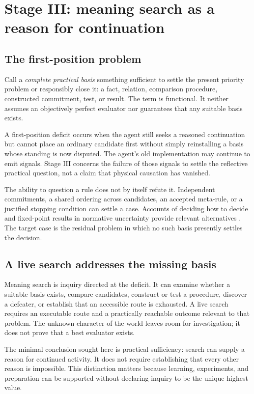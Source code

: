 \documentclass[11pt,a4paper]{article}
\begin{document}
\section{Stage III: meaning search as a reason for continuation}
\subsection{The first-position problem}
Call a \emph{complete practical basis} something sufficient to settle the present priority problem or responsibly close it: a fact, relation, comparison procedure, constructed commitment, test, or result. The term is functional. It neither assumes an objectively perfect evaluator nor guarantees that any suitable basis exists.

A first-position deficit occurs when the agent still seeks a reasoned continuation but cannot place an ordinary candidate first without simply reinstalling a basis whose standing is now disputed. The agent's old implementation may continue to emit signals. Stage III concerns the failure of those signals to settle the reflective practical question, not a claim that physical causation has vanished.

The ability to question a rule does not by itself refute it. Independent commitments, a shared ordering across candidates, an accepted meta-rule, or a justified stopping condition can settle a case. Accounts of deciding how to decide and fixed-point results in normative uncertainty provide relevant alternatives \cite{lin2014,trammell2021}. The target case is the residual problem in which no such basis presently settles the decision.

\subsection{A live search addresses the missing basis}
Meaning search is inquiry directed at the deficit. It can examine whether a suitable basis exists, compare candidates, construct or test a procedure, discover a defeater, or establish that an accessible route is exhausted. A live search requires an executable route and a practically reachable outcome relevant to that problem. The unknown character of the world leaves room for investigation; it does not prove that a best evaluator exists.

The minimal conclusion sought here is practical sufficiency: search can supply a reason for continued activity. It does not require establishing that every other reason is impossible. This distinction matters because learning, experiments, and preparation can be supported without declaring inquiry to be the unique highest value.
\end{document}
